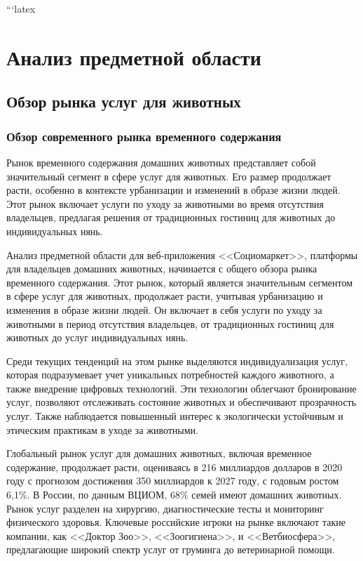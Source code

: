 ```latex
\section{Анализ предметной области}

\subsection{Обзор рынка услуг для животных}

\subsubsection{Обзор современного рынка временного содержания}

Рынок временного содержания домашних животных представляет собой значительный сегмент в сфере услуг для животных. Его размер продолжает расти, особенно в контексте урбанизации и изменений в образе жизни людей. Этот рынок включает услуги по уходу за животными во время отсутствия владельцев, предлагая решения от традиционных гостиниц для животных до индивидуальных нянь.

Анализ предметной области для веб-приложения <<Социомаркет>>, платформы для владельцев домашних животных, начинается с общего обзора рынка временного содержания. Этот рынок, который является значительным сегментом в сфере услуг для животных, продолжает расти, учитывая урбанизацию и изменения в образе жизни людей. Он включает в себя услуги по уходу за животными в период отсутствия владельцев, от традиционных гостиниц для животных до услуг индивидуальных нянь.

Среди текущих тенденций на этом рынке выделяются индивидуализация услуг, которая подразумевает учет уникальных потребностей каждого животного, а также внедрение цифровых технологий. Эти технологии облегчают бронирование услуг, позволяют отслеживать состояние животных и обеспечивают прозрачность услуг. Также наблюдается повышенный интерес к экологически устойчивым и этическим практикам в уходе за животными.

Глобальный рынок услуг для домашних животных, включая временное содержание, продолжает расти, оцениваясь в 216 миллиардов долларов в 2020 году с прогнозом достижения 350 миллиардов к 2027 году, с годовым ростом 6,1\%​​. В России, по данным ВЦИОМ, 68\% семей имеют домашних животных. Рынок услуг разделен на хирургию, диагностические тесты и мониторинг физического здоровья​​. Ключевые российские игроки на рынке включают такие компании, как <<Доктор Зоо>>, <<Зоогигиена>>, и <<Ветбиосфера>>, предлагающие широкий спектр услуг от груминга до ветеринарной помощи.

